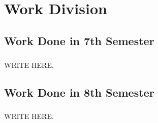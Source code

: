 \chapter{Work Division}
\section{Work Done in 7th Semester}
\paragraph{} WRITE HERE.


\section{Work Done in 8th Semester}
\paragraph{} WRITE HERE.
